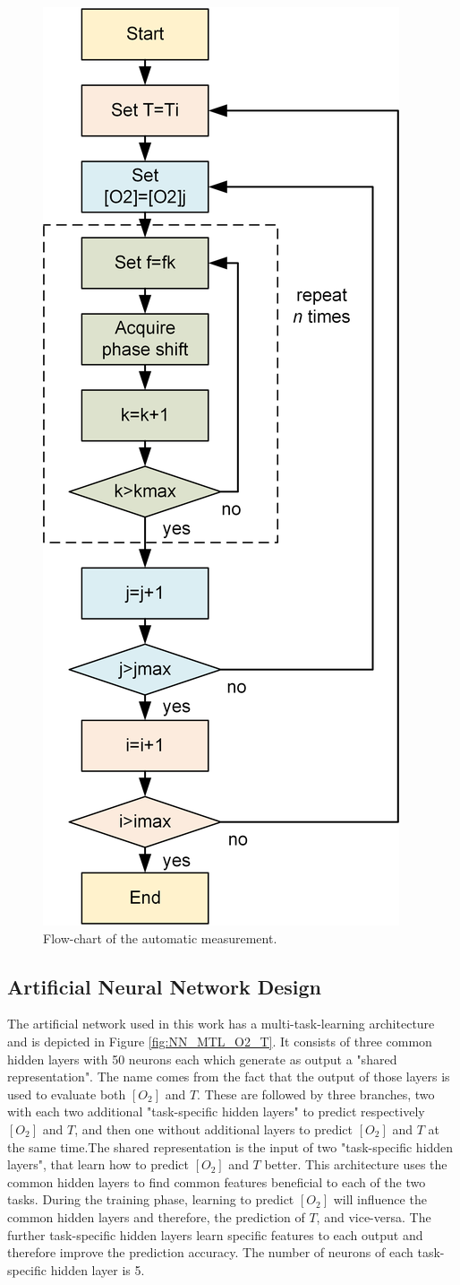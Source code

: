 \documentclass[9pt,twocolumn,twoside,pdftex]{optica}
\begin{document}
\begin{figure}[htbp]
\centering
\includegraphics[keepaspectratio, width=5 cm]{flow-chart.png}
\caption{Flow-chart of the automatic measurement.}
\label{fig:auto-data}
\end{figure}

\subsection{Artificial Neural Network Design}
\label{NN}

The artificial network used in this work has a multi-task-learning architecture and is depicted in Figure \ref{fig:NN_MTL_O2_T}. It consists of three common hidden layers with 50 neurons each which generate as output a "shared representation". The name comes from the fact that the output of those layers is used to evaluate both $[O_2]$ and $T$. These are followed by three branches, two with each two additional "task-specific hidden layers" to predict respectively $[O_2]$ and $T$, and then one without additional layers to predict $[O_2]$ and $T$ at the same time.The shared representation is the input of two "task-specific hidden layers", that learn how to predict $[O_2]$ and $T$ better. This architecture uses the common hidden layers to find common features beneficial to each of the two tasks. During the training phase, learning to predict $[O_2]$ will influence the common hidden layers and therefore, the prediction of $T$, and vice-versa. The further task-specific hidden layers learn specific features to each output and therefore improve the prediction accuracy. The number of neurons of each task-specific hidden layer is 5.
\end{document}
